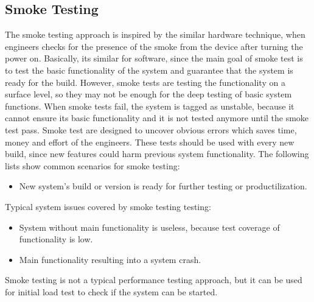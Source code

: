 \subsection*{Smoke Testing}
The smoke testing approach is inspired by the similar hardware technique, when engineers checks for the presence of the smoke from the device after turning the power on. Basically, its similar for software, since the main goal of smoke test is to test the basic functionality of the system and guarantee that the system is ready for the build. However, smoke tests are testing the functionality on a surface level, so they may not be enough for the deep testing of basic system functions. When smoke tests fail, the system is tagged as unstable, because it cannot ensure its basic functionality and it is not tested anymore until the smoke test pass. Smoke test are designed to uncover obvious errors which saves time, money and effort of the engineers. These tests should be used with every new build, since new features could harm previous system functionality.
The following lists show common scenarios for smoke testing:
\begin{itemize}
	\setlength\itemsep{0em}
	\item New system's build or version is ready for further testing or productilization.
\end{itemize}
Typical system issues covered by smoke testing testing:
\begin{itemize}
	\setlength\itemsep{0em}
	\item System without main functionality is useless, because test coverage of functionality is low.
	\item Main functionality resulting into a system crash.
\end{itemize}

Smoke testing is not a typical performance testing approach, but it can be used for initial load test to check if the system can be started.


